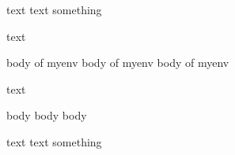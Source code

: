 text text
\if something 
\fi

text \begin{myenv}
  body of myenv
  body of myenv
  body of myenv \end{myenv}

text

\begin{anotherenv}
  body
  body
  body
\end{anotherenv}

text text \if something \fi

